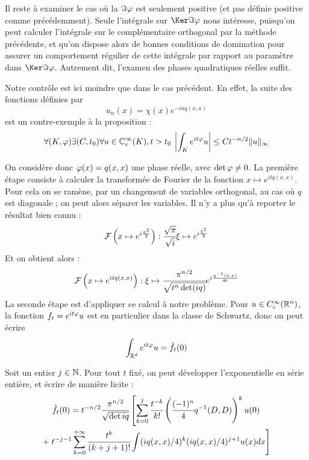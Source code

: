 Il reste à examiner le cas où la $\Im \varphi$ est seulement positive (et pas définie positive comme précédemment). Seule l'intégrale sur $\Ker \Im \fii$ nous intéresse, puisqu'on peut calculer l'intégrale sur le complémentaire orthogonal par la méthode précédente, et qu'on dispose alors de bonnes conditions de domination pour assurer un comportement régulier de cette intégrale par rapport au paramètre dans $\Ker \Im \fii$. Autrement dit, l'examen des phases quadratiques réelles suffit.

Notre contrôle est ici moindre que dans le cas précédent. En effet, la suite des fonctions définies par
\begin{equation*}
  u_n(x)=\chi(x)e^{-inq(x,x)}
\end{equation*}
est un contre-exemple à la proposition :
\begin{equation*}
  \forall (K,\varphi) \exists (C,t_0) \forall u \in \mathbb{C}^{\infty}_c(K),t>t_0\: \left|\int_Ke^{it\varphi}u\right| \leq Ct^{-n/2}\|u\|_{\infty}
\end{equation*}

On considère donc $\varphi(x)=q(x,x)$ une phase réelle, avec $\det \varphi \neq 0$. La première étape consiste à calculer la transformée de Fourier de la fonction $x\mapsto e^{itq(x,x)}$. Pour cela on se ramène, par un changement de variables orthogonal, au cas où $q$ est diagonale ; on peut alors séparer les variables. Il n'y a plus qu'à reporter le résultat bien connu :
\begin{equation*}
  \mathcal{F}\left(x\mapsto e^{i\frac{x^2}{2}}\right) : \cfrac{\sqrt{\pi}}{\sqrt{i}}\xi \mapsto e^{i\frac{\xi^2}{2}}
\end{equation*}
\noindent Et on obtient alors :
\begin{equation*}
  \mathcal{F}\left(x\mapsto e^{itq(x,x)}\right) : \xi \mapsto \cfrac{\pi^{n/2}}{\sqrt{t^n \det (iq)}}e^{i\frac{q^{-1}(x,x)}{4t}}
\end{equation*}
La seconde étape est d'appliquer ce calcul à notre problème. Pour $u \in C^{\infty}_c(\mathbb{R}^n)$, la fonction $f_t=e^{it\varphi}u$ est en particulier dans la classe de Schwartz, donc on peut écrire
\begin{equation*}
  \int_{\mathbb{R}^d}e^{it\varphi}u = \hat{f_t}(0)
\end{equation*}

Soit un entier $j \in \mathbb{N}$. Pour tout $t$ fixé, on peut développer l'exponentielle en série entière, et écrire de manière licite :
\begin{multline*}
  \hat{f_t}(0)=t^{-n/2}\cfrac{\pi^{n/2}}{\sqrt{\det{iq}}}\left[\sum_{k=0}^{j}\cfrac{t^{-k}}{k!}\left(\cfrac{(-1)^n}{4}q^{-1}(D,D)\right)^ku(0)\right. \\+ \left.t^{-j-1}\sum_{k=0}^{+\infty}\cfrac{t^k}{(k+j+1)!}\int (iq(x,x)/4)^k(iq(x,x)/4)^{j+1}u(x)dx\right]
\end{multline*}

